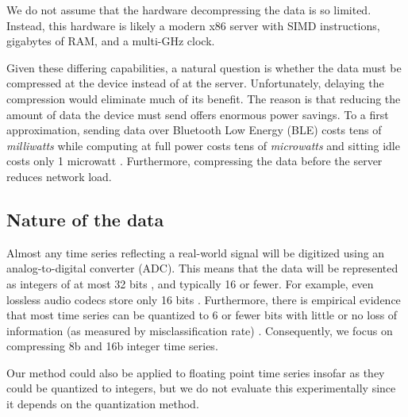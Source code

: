 We do not assume that the hardware decompressing the data is so limited. Instead, this hardware is likely a modern x86 server with SIMD instructions, gigabytes of RAM, and a multi-GHz clock.

Given these differing capabilities, a natural question is whether the data must be compressed at the device instead of at the server. Unfortunately, delaying the compression would eliminate much of its benefit. The reason is that reducing the amount of data the device must send offers enormous power savings. To a first approximation, sending data over Bluetooth Low Energy (BLE) costs tens of \textit{milliwatts} while computing at full power costs tens of \textit{microwatts} and sitting idle costs only 1 microwatt \cite{cc2540, cc2640}. Furthermore, compressing the data before the server reduces network load.


\subsection{Nature of the data}

Almost any time series reflecting a real-world signal will be digitized using an analog-to-digital converter (ADC). This means that the data will be represented as integers of at most 32 bits \cite{digikeyADCs}, and typically 16 or fewer. For example, even lossless audio codecs store only 16 bits \cite{flac, shorten}. Furthermore, there is empirical evidence that most time series can be quantized to 6 or fewer bits with little or no loss of information (as measured by misclassification rate) \cite{epenthesis}. Consequently, we focus on compressing 8b and 16b integer time series. %

Our method could also be applied to floating point time series insofar as they could be quantized to integers, but we do not evaluate this experimentally since it depends on the quantization method.

